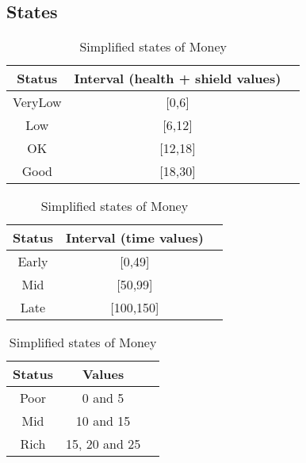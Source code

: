 \documentclass{article}
\begin{document}
  \subsection{States}
  \begin{table}[h!]
      \parbox{.3\linewidth}{
        \centering
        \caption{Simplified states of Health}
        \label{tab:tableA*1}
        \begin{tabular}{c|c|c}
          \textbf{Status} & \textbf{Interval (health + shield values)}\\
          \hline
          VeryLow & [0,6]\\
          Low & [6,12]\\
          OK & [12,18]\\
          Good & [18,30]\\
        \end{tabular}
      }
      \hfil
      \parbox{.3\linewidth}{
        \centering
        \caption{Simplified states of Time}
        \label{tab:tableA*2}
        \begin{tabular}{c|c|c}
          \textbf{Status} & \textbf{Interval (time values)}\\
          \hline
          Early  & [0,49]\\
          Mid & [50,99]\\
          Late & [100,150]\\
        \end{tabular}
      }
      \hfil
      \parbox{.3\linewidth}{
        \centering
        \caption{Simplified states of Money}
        \label{tab:tableA*2}
        \begin{tabular}{c|c|c}
          \textbf{Status} & \textbf{Values}\\
          \hline
          Poor & 0 and 5\\
          Mid & 10 and 15\\
          Rich & 15, 20 and 25\\
        \end{tabular}
      }
  \end{table}
\end{document}
